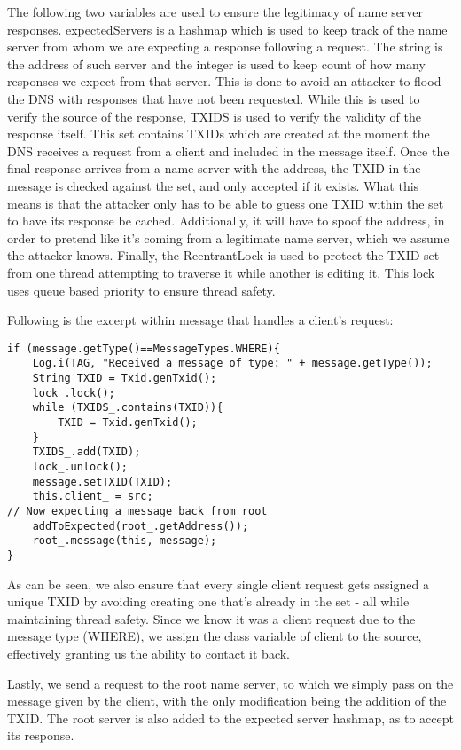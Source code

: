 \documentclass[a4paper, 12pt]{article} %
\begin{document}
The following two variables are used to ensure the legitimacy of name server responses. expectedServers is a hashmap which is used to keep track of the name server from whom we are expecting a response following a request. The string is the address of such server and the integer is used to keep count of how many responses we expect from that server. This is done to avoid an attacker to flood the DNS with responses that have not been requested. While this is used to verify the source of the response, TXIDS is used to verify the validity of the response itself. This set contains TXIDs which are created at the moment the DNS receives a request from a client and included in the message itself. Once the final response arrives from a name server with the address, the TXID in the message is checked against the set, and only accepted if it exists. What this means is that the attacker only has to be able to guess one TXID within the set to have its response be cached. Additionally, it will have to spoof the address, in order to pretend like it's coming from a legitimate name server, which we assume the attacker knows. Finally, the ReentrantLock is used to protect the TXID set from one thread attempting to traverse it while another is editing it. This lock uses queue based priority to ensure thread safety. 

Following is the excerpt within message that handles a client's request: 

\begin{lstlisting}
if (message.getType()==MessageTypes.WHERE){
    Log.i(TAG, "Received a message of type: " + message.getType());
    String TXID = Txid.genTxid();
    lock_.lock();
    while (TXIDS_.contains(TXID)){
    	TXID = Txid.genTxid();
    }
    TXIDS_.add(TXID);
    lock_.unlock();
    message.setTXID(TXID);
    this.client_ = src;            
// Now expecting a message back from root
    addToExpected(root_.getAddress());
    root_.message(this, message);           
}	
\end{lstlisting}

As can be seen, we also ensure that every single client request gets assigned a unique TXID by avoiding creating one that's already in the set - all while maintaining thread safety. Since we know it was a client request due to the message type (WHERE), we assign the class variable of client to the source, effectively granting us the ability to contact it back. 

Lastly, we send a request to the root name server, to which we simply pass on the message given by the client, with the only modification being the addition of the TXID. The root server is also added to the expected server hashmap, as to accept its response. 
\end{document}
